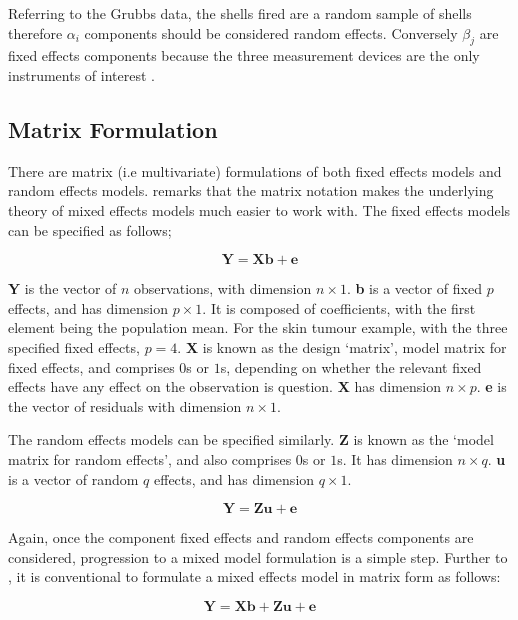 \documentclass[12pt, a4paper]{report}
\theoremstyle{plain}
\theoremstyle{definition}
\theoremstyle{remark}
\begin{document}
Referring to the Grubbs data, the shells fired are a random sample
of shells therefore $\alpha_{i}$ components should be considered
random effects. Conversely $\beta_{j}$ are fixed effects
components because the three measurement devices are the only
instruments of interest \citep{Searle}.



\subsection{Matrix Formulation} There are matrix (i.e multivariate)
formulations of both fixed effects models and random effects
models. \citet{BrownPrescott} remarks that the matrix notation
makes the underlying theory of mixed effects models much easier to
work with. The fixed effects models can be specified as follows;

\begin{equation}
\textbf{Y} = \textbf{Xb} + \textbf{e}
\end{equation}

\textbf{Y} is the vector of $n$ observations, with dimension $n
\times 1$. \textbf{b} is a vector of fixed $p$ effects, and has
dimension $p \times 1$. It is composed of coefficients, with the
first element being the population mean. For the skin tumour
example, with the three specified fixed effects, $p=4$. \textbf{X}
is known as the design `matrix', model matrix for fixed effects,
and comprises $0$s or $1$s, depending on whether the relevant
fixed effects have any effect on the observation is question.
\textbf{X} has dimension $n \times p$. \textbf{e} is the vector of
residuals with dimension $n \times 1$.

The random effects models can be specified similarly. \textbf{Z}
is known as the `model matrix for random effects', and also
comprises $0$s or $1$s. It has dimension $n \times q$. \textbf{u}
is a vector of random $q$ effects, and has dimension $q \times 1$.

\begin{equation}
\textbf{Y} = \textbf{Zu} + \textbf{e}
\end{equation}

Again, once the component fixed effects and random effects
components are considered, progression to a mixed model
formulation is a simple step. Further to \citet{LW82}, it is
conventional to formulate a mixed effects model in matrix form as
follows:

\begin{equation}
\textbf{Y} = \textbf{Xb} + \textbf{Zu} + \textbf{e}
\end{equation}
\end{document}
